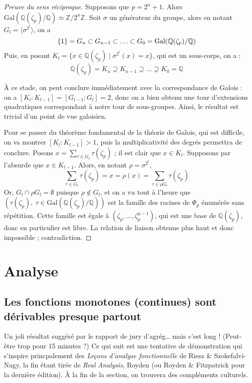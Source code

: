 \documentclass[a4paper, 11pt]{article}
\def\Z{\mathbb{Z}}
\def\Q{\mathbb{Q}}
\begin{document}
\begin{proof}[Preuve du sens réciproque]
  Supposons que $p = 2^n + 1$. Alors $\mathrm{Gal}(\Q(\zeta_p)/\Q) \simeq
  \Z/2^n\Z$. Soit $\sigma$ un générateur du groupe, alors en notant $G_l =
  \langle \sigma^{2^l} \rangle$, on a
  \[ \{1\} = G_n \subset G_{n-1} \subset \ldots \subset G_0 =
    \textnormal{Gal}(\Q(\zeta_p)/\Q) \]
  Puis, en posant $K_l = \{x \in \Q(\zeta_p) \mid \sigma^{2^l}(x) = x\}$,
  qui est un sous-corps, on a :
  \[ \Q(\zeta_p) = K_n \supseteq K_{n-1} \supseteq \ldots \supseteq K_0 = \Q \]

  À ce stade, on peut conclure immédiatement avec la correspondance de Galois :
  on a $[K_l : K_{l-1}] = [G_{l-1} : G_l] = 2$, donc on a bien obtenu une tour
  d'extensions quadratiques correspondant à notre tour de sous-groupes. Ainsi,
  le résultat est trivial d'un point de vue galoisien.

  Pour se passer du théorème fondamental de la théorie de Galois, qui est
  difficile, on va montrer $[K_l : K_{l-1}] > 1$, puis la multiplicativité des
  degrés permettra de conclure. Posons $x = \sum_{\tau \in G_l} \tau(\zeta_p)$ ;
  il est clair que $x \in K_l$. Supposons par l'absurde que $x \in K_{l-1}$.
  Alors, en notant $\rho = \sigma^{2^l}$,
  \[ \sum_{\tau \in G_l} \tau(\zeta_p) = x = \rho(x) = \sum_{\tau \in \rho G_l}
    \tau(\zeta_p) \]
  Or, $G_l \cap \rho G_l = \emptyset$ puisque $\rho \notin G_l$, et on a vu tout
  à l'heure que $(\tau(\zeta_p),\;\tau \in \mathrm{Gal}(\Q(\zeta_p)/\Q))$ est la
  famille des racines de $\Phi_p$ énumérée sans répétition. Cette famille est
  égale à $(\zeta_p, \ldots, \zeta_p^{p-1})$, qui est une base de $\Q(\zeta_p)$,
  donc en particulier est libre. La relation de liaison obtenue plus haut et
  donc impossible ; contradiction.
\end{proof}


\newpage

\section{Analyse}

\subsection{Les fonctions monotones (continues) sont dérivables presque partout}
\label{monotone}

Un joli résultat suggéré par le rapport de jury d'agrég… mais c'est long !
(Peut-être trop pour 15 minutes ?) Ce qui suit est une tentative de
démonstration qui s'inspire princpalement des \emph{Leçons d'analyse
  fonctionnelle} de Riesz \& Szokefalvi-Nagy, la fin étant tirée de \emph{Real
  Analysis}, Royden (ou Royden \& Fitzpatrick pour la dernière édition). À la
fin de la section, on trouvera des compléments culturels.
\end{document}
